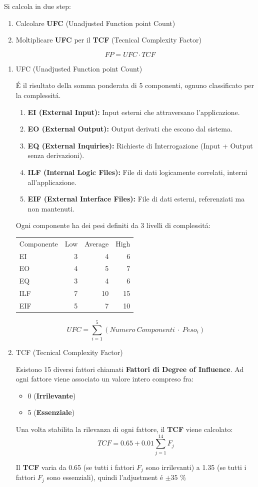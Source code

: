 \documentclass[11pt]{article}
\begin{document}
Si calcola in due step:
\begin{enumerate}
\item Calcolare \textbf{\textbf{UFC}} (Unadjusted Function point Count)
\item Moltiplicare \textbf{\textbf{UFC}} per il \textbf{\textbf{TCF}} (Tecnical Complexity Factor)
\end{enumerate}
$$FP = UFC \cdot TCF$$
\begin{enumerate}
\item UFC (Unadjusted Function point Count)
\label{sec:orga23591a}

É il risultato della somma ponderata di 5 componenti, ognuno classificato per la complessitá.
\begin{enumerate}
\item \textbf{\textbf{EI (External Input):}} Input esterni che attraversano l'applicazione.
\item \textbf{\textbf{EO (External Output):}} Output derivati che escono dal sistema.
\item \textbf{\textbf{EQ (External Inquiries):}} Richieste di Interrogazione (Input + Output senza derivazioni).
\item \textbf{\textbf{ILF (Internal Logic Files):}} File di dati logicamente correlati, interni all'applicazione.
\item \textbf{\textbf{EIF (External Interface Files):}} File di dati esterni, referenziati ma non mantenuti.
\end{enumerate}

Ogni componente ha dei pesi definiti da 3 livelli di complessitá:

\begin{center}
\begin{tabular}{lrrr}
Componente & Low & Average & High\\
EI & 3 & 4 & 6\\
EO & 4 & 5 & 7\\
EQ & 3 & 4 & 6\\
ILF & 7 & 10 & 15\\
EIF & 5 & 7 & 10\\
\end{tabular}
\end{center}

$$UFC = \sum^{5}_{i=1}(Numero \ Componenti \ \cdot \ Peso_{i})$$
\item TCF (Tecnical Complexity Factor)
\label{sec:org0bc2beb}

Esistono 15 diversi fattori chiamati \textbf{\textbf{Fattori di Degree of Influence}}.
Ad ogni fattore viene associato un valore intero compreso fra:
\begin{itemize}
\item 0 (\textbf{\textbf{Irrilevante}})
\item 5 (\textbf{\textbf{Essenziale}})
\end{itemize}

Una volta stabilita la rilevanza di ogni fattore, il \textbf{\textbf{TCF}} viene calcolato:
$$TCF = 0.65 + 0.01 \sum^{14}_{j=1} F_{j}$$

Il \textbf{\textbf{TCF}} varia da 0.65 (se tutti i fattori \(F_{j}\) sono irrilevanti) a 1.35 (se tutti i fattori \(F_{j}\) sono essenziali), quindi l'adjustment é \(\pm 35\)  \%
\end{enumerate}
\end{document}
